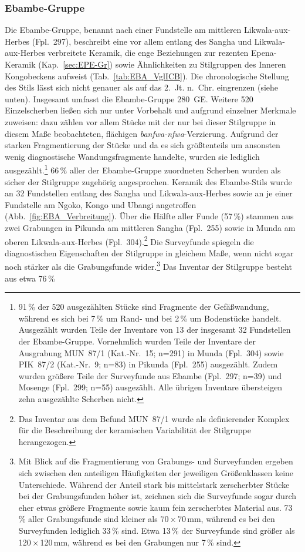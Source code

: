 \subsubsection{Ebambe-Gruppe}\label{sec:EBA-Gr}

Die Ebambe-Gruppe, benannt nach einer Fundstelle am mittleren \mbox{Likwala}-\mbox{aux}-\mbox{Herbes} (Fpl.~297), beschreibt eine vor allem entlang des \mbox{Sangha} und \mbox{Likwala}-\mbox{aux}-\mbox{Herbes} verbreitete Keramik, die enge Beziehungen zur rezenten Epena-Keramik (Kap.~\ref{sec:EPE-Gr}) sowie Ähnlichkeiten zu Stilgruppen des Inneren Kongobeckens aufweist (Tab.~\ref{tab:EBA_VglICB}). Die chronologische Stellung des Stils lässt sich nicht genauer als auf das 2.~Jt. n.~Chr. eingrenzen (siehe unten). Insgesamt umfasst die Ebambe-Gruppe 280~GE. Weitere 520 Einzelscherben ließen sich nur unter Vorbehalt und aufgrund einzelner Merkmale zuweisen: dazu zählen vor allem Stücke mit der nur bei dieser Stilgruppe in diesem Maße beobachteten, flächigen \textit{banfwa-nfwa}-Verzierung. Aufgrund der starken Fragmentierung der Stücke und da es sich größtenteils um ansonsten wenig diagnostische Wandungsfragmente handelte, wurden sie lediglich ausgezählt.\footnote{91\,\% der 520 ausgezählten Stücke sind Fragmente der Gefäßwandung, während es sich bei 7\,\% um Rand- und bei 2\,\% um Bodenstücke handelt. Ausgezählt wurden Teile der Inventare von 13 der insgesamt 32 Fundstellen der Ebambe-Gruppe. Vornehmlich wurden Teile der Inventare der Ausgrabung MUN~87/1 (Kat.-Nr.~15; n=291) in Munda (Fpl.~304) sowie PIK~87/2 (Kat.-Nr.~9; n=83) in Pikunda (Fpl.~255) ausgezählt. Zudem wurden größere Teile der Surveyfunde aus Ebambe (Fpl.~297; n=39) und Mosenge (Fpl.~299; n=55) ausgezählt. Alle übrigen Inventare übersteigen zehn ausgezählte Scherben nicht.} 66\,\% aller der Ebambe-Gruppe zuordneten Scherben wurden als sicher der Stilgruppe zugehörig angesprochen. Keramik des Ebambe-Stils wurde an 32 Fundstellen entlang des \mbox{Sangha} und \mbox{Likwala}-\mbox{aux}-\mbox{Herbes} sowie an je einer Fundstelle am \mbox{Ngoko}, Kongo und \mbox{Ubangi} angetroffen (Abb.~\ref{fig:EBA_Verbreitung}). Über die Hälfte aller Funde (57\,\%) stammen aus zwei Grabungen in Pikunda am mittleren \mbox{Sangha} (Fpl.~255) sowie in Munda am oberen \mbox{Likwala}-\mbox{aux}-\mbox{Herbes} (Fpl.~304).\footnote{Das Inventar aus dem Befund MUN~87/1 wurde als definierender Komplex für die Beschreibung der keramischen Variabilität der Stilgruppe herangezogen.} Die Surveyfunde spiegeln die diagnostischen Eigenschaften der Stilgruppe in gleichem Maße, wenn nicht sogar noch stärker als die Grabungsfunde wider.\footnote{Mit Blick auf die Fragmentierung von Grabungs- und Surveyfunden ergeben sich zwischen den anteiligen Häufigkeiten der jeweiligen Größenklassen keine Unterschiede. Während der Anteil stark bis mittelstark zerscherbter Stücke bei der Grabungsfunden höher ist, zeichnen sich die Surveyfunde sogar durch eher etwas größere Fragmente sowie kaum fein zerscherbtes Material aus. 73\,\% aller Grabungsfunde sind kleiner als 70\,$\times$\,70\,mm, während es bei den Surveyfunden lediglich 33\,\% sind. Etwa 13\,\% der Surveyfunde sind größer als 120\,$\times$\,120\,mm, während es bei den Grabungen nur 7\,\% sind.} Das Inventar der Stilgruppe besteht aus etwa 76\,\% 